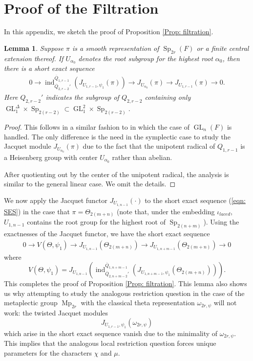 \documentclass[11pt,reqno]{amsart}
\newtheorem{Lem}[Thm]{Lemma}
\theoremstyle{definition}
\theoremstyle{remark}
\theoremstyle{definition}
\begin{document}
\section{Proof of the Filtration}\label{Appendix A}
In this appendix, we sketch the proof of Proposition \ref{Prop: filtration}. 
\begin{Lem}\label{Lem: SES}
Suppose $\pi$ is a smooth representation of $\operatorname{Sp}_{2r}(F)$ or a finite central extension thereof. If $U_{{\alpha}_0}$ denotes the root subgroup for the highest root ${\alpha}_0$, then there is a short exact sequence
\begin{align}\label{eqn: SES}
0 \longrightarrow \operatorname{ind}_{\overline{Q}_{2,r-2}'}^{\overline{Q}_{1,r-1}}\left(J_{U_{1,r-1},\psi_1}(\pi)\right) \longrightarrow J_{U_{{\alpha}_0}}(\pi)\longrightarrow J_{U_{1,r-1}}(\pi)\longrightarrow 0.
\end{align}
Here $Q_{2,r-2}'$ indicates the subgroup of $Q_{2,r-2}$ containing only $\operatorname{GL}_1^\Delta\times \operatorname{Sp}_{2(r-2)}\subset \operatorname{GL}_1^2\times \operatorname{Sp}_{2(r-2)}$.
\end{Lem}
\begin{proof}
This follows in a similar fashion to \cite[Prop. 5.12 (d)]{BZ2} in which the case of $\operatorname{GL}_n(F)$ is handled. The only difference is the need in the symplectic case to study the Jacquet module $J_{U_{{\alpha}_0}}(\pi)$ due to the fact that the unipotent radical of $Q_{1,r-1}$ is a Heisenberg group with center $U_{{\alpha}_0}$ rather than abelian. 

After quotienting out by the center of the unipotent radical, the analysis is similar to the general linear case. We omit the details.
\end{proof}
We now apply the Jacquet functor $J_{U_{1,n-1}}(\cdot)$ to the short exact sequence (\ref{eqn: SES}) in the case that $\pi = \Theta_{2(m+n)}$ (note that, under the embedding $\iota_{laced}$, $U_{1,n-1}$ contains the root group for the highest root of $\operatorname{Sp}_{2(n+m)}$). Using the exactnesses of the Jacquet functor, we have the short exact sequence
\begin{align}\label{eqn: theta SES}
0 \longrightarrow V(\Theta,\psi_1)\longrightarrow J_{U_{1,n-1}}(\Theta_{2(m+n)})\longrightarrow J_{U_{1,n+m-1}}(\Theta_{2(m+n)})\longrightarrow 0
\end{align}
where
\[
V(\Theta,\psi_1)=J_{U_{1,n-1}}\left(\operatorname{ind}_{\overline{Q}_{2,n+m-2}'}^{\overline{Q}_{1,n+m-1}}\left(J_{U_{1,n+m-1},\psi_1}(\Theta_{2(m+n)})\right)\right).
\]
 This completes the proof of Proposition \ref{Prop: filtration}. This lemma also shows us why attempting to study the analogous restriction question in the case of the metaplectic group $\operatorname{Mp}_{2r}$ with the classical theta representation $\omega_{2r,\psi}$ will not work: the twisted Jacquet modules 
\[
J_{U_{1,r-1},\psi_1}(\omega_{2r,\psi})
\]
which arise in the short exact sequence vanish due to the minimality of $\omega_{2r,\psi}$. This implies that the analogous local restriction question forces unique parameters for the characters $\chi$ and $\mu$.
\end{document}
